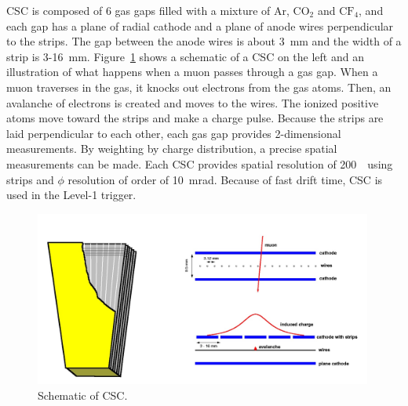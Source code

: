 CSC is composed of 6 gas gaps filled with a mixture of Ar, $\textrm{CO}_2$ and $\textrm{CF}_4$,
and each gap has a plane of radial cathode and a plane of anode wires perpendicular 
to the strips. The gap between the anode wires is about 3~mm and the width of a strip 
is 3-16~mm. Figure~\ref{fig:muon_dt} shows a schematic of a CSC on the left 
and an illustration of what happens when a muon passes through a gas gap. 
When a muon traverses in the gas, it knocks out electrons from the gas atoms. 
Then, an avalanche of electrons is created and moves to the wires.
The ionized positive atoms move toward the strips and make a charge pulse. 
Because the strips are laid perpendicular to each other, 
each gas gap provides 2-dimensional measurements. 
By weighting by charge distribution, a precise spatial measurements can be made. 
Each CSC provides spatial resolution of 200~\um\ using strips 
and $\phi$ resolution of order of 10~mrad.
Because of fast drift time, CSC is used in the Level-1 trigger. 
%
\begin{figure}[h] 
\centering
\vspace{1cm}
\includegraphics[width=0.99\textwidth]{figures/csc.jpg}
\caption{Schematic of CSC.}
\label{fig:muon_dt} 
\end{figure} 

